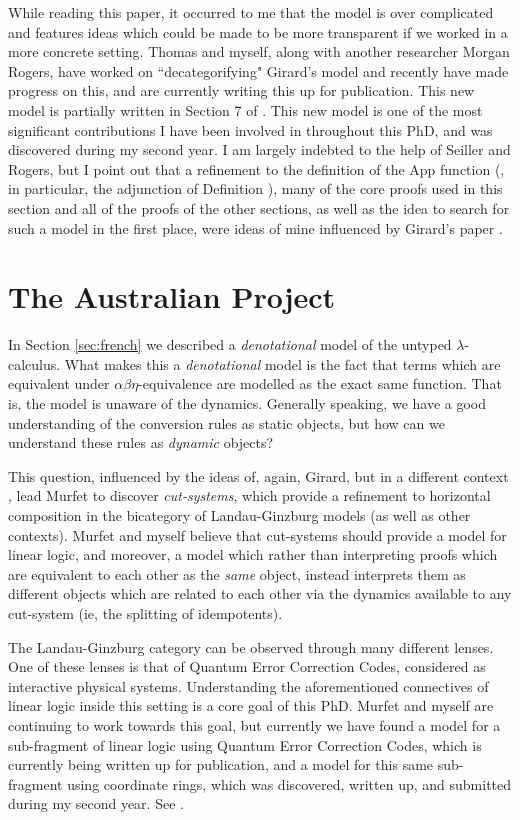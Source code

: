 \documentclass[12pt]{article}
\theoremstyle{plain}
\theoremstyle{definition}
\begin{document}
	While reading this paper, it occurred to me that the model is over complicated and features ideas which could be made to be more transparent if we worked in a more concrete setting. Thomas and myself, along with another researcher Morgan Rogers, have worked on ``decategorifying" Girard's model and recently have made progress on this, and are currently writing this up for publication. This new model is partially written in Section 7 of \cite{TroianiPolynomialFunct}. This new model is one of the most significant contributions I have been involved in throughout this PhD, and was discovered during my second year. I am largely indebted to the help of Seiller and Rogers, but I point out that a refinement to the definition of the App function (\cite[Definition 7.2.1]{TroianiPolynomialFunct}, in particular, the adjunction of Definition \cite[Definition 7.1.1]{TroianiPolynomialFunct}), many of the core proofs used in this section and all of the proofs of the other sections, as well as the idea to search for such a model in the first place, were ideas of mine influenced by Girard's paper \cite{Girard}.
	
	\section{The Australian Project}
	In Section \ref{sec:french} we described a \emph{denotational} model of the untyped $\lambda$-calculus. What makes this a \emph{denotational} model is the fact that terms which are equivalent under $\alpha\beta\eta$-equivalence are modelled as the exact same function. That is, the model is unaware of the dynamics. Generally speaking, we have a good understanding of the conversion rules as static objects, but how can we understand these rules as \emph{dynamic} objects?
	
	This question, influenced by the ideas of, again, Girard, but in a different context \cite{GoI}, lead Murfet to discover \emph{cut-systems}, which provide a refinement to horizontal composition in the bicategory of Landau-Ginzburg models (as well as other contexts). Murfet and myself believe that cut-systems should provide a model for linear logic, and moreover, a model which rather than interpreting proofs which are equivalent to each other as the \emph{same} object, instead interprets them as different objects which are related to each other via the dynamics available to any cut-system (ie, the splitting of idempotents).
	
	The Landau-Ginzburg category can be observed through many different lenses. One of these lenses is that of Quantum Error Correction Codes, considered as interactive physical systems. Understanding the aforementioned connectives of linear logic inside this setting is a core goal of this PhD. Murfet and myself are continuing to work towards this goal, but currently we have found a model for a sub-fragment of linear logic using Quantum Error Correction Codes, which is currently being written up for publication, and a model for this same sub-fragment using coordinate rings, which was discovered, written up, and submitted during my second year. See \cite{AlgPnt}.
	
\end{document}
